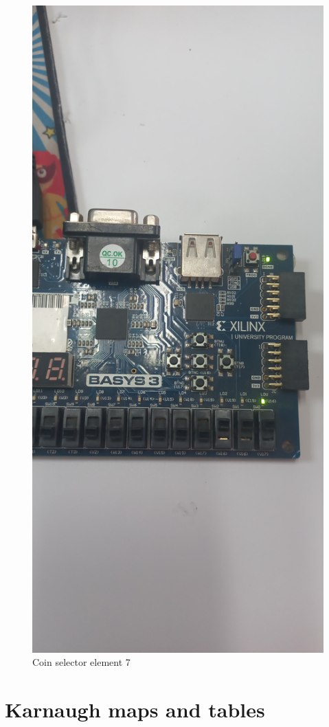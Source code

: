 \documentclass{article}
\begin{document}
\begin{multicols}{2}
	\begin{figure}[H]
		\centering
		\includegraphics[width=0.8\linewidth]{images/diagrams/coin-selector/coin-selector7.jpg}
		\caption{Coin selector element 7}
		\label{Coin selector element 7 Apendix}
	\end{figure}

	\section{Karnaugh maps and tables}\label{Karnaugh maps and tables}


\end{multicols}
\end{document}
